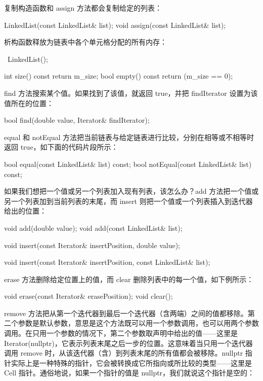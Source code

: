 复制构造函数和 assign 方法都会复制给定的列表：

\begin{codebox}
    LinkedList(const LinkedList& list);
    void assign(const LinkedList& list);
\end{codebox}

析构函数释放为链表中各个单元格分配的所有内存：

\begin{codebox}
    ~LinkedList();

    int size() const {return m_size;}
    bool empty() const {return (m_size == 0);}
\end{codebox}

find 方法搜索某个值。如果找到了该值，就返回 true，并把 findIterator 设置为该值所在的位置：

\begin{codebox}
    bool find(double value, Iterator& findIterator);
\end{codebox}

equal 和 notEqual 方法把当前链表与给定链表进行比较，分别在相等或不相等时返回 true，如下面的代码片段所示：

\begin{codebox}
    bool equal(const LinkedList& list) const;
    bool notEqual(const LinkedList& list) const;
\end{codebox}

如果我们想把一个值或另一个列表加入现有列表，该怎么办？add 方法把一个值或另一个列表加到当前列表的末尾，而 insert 则把一个值或一个列表插入到迭代器给出的位置：

\begin{codebox}
    void add(double value);
    void add(const LinkedList& list);

    void insert(const Iterator& insertPosition, double value);

    void insert(const Iterator& insertPosition,
                const LinkedList& list);
\end{codebox}

erase 方法删除给定位置上的值，而 clear 删除列表中的每一个值，如下例所示：

\begin{codebox}
    void erase(const Iterator& erasePosition);
    void clear();
\end{codebox}

remove 方法把从第一个迭代器到最后一个迭代器（含两端）之间的值都移除。第二个参数是默认参数，意思是这个方法既可以用一个参数调用，也可以用两个参数调用。在只用一个参数的情况下，第二个参数取声明中给出的值——这里是 Iterator(nullptr)，它表示列表末尾之后一步的位置。这意味着当只用一个迭代器调用 remove 时，从该迭代器（含）到列表末尾的所有值都会被移除。nullptr 指针实际上是一种特殊的指针，它会被转换成它所指向或所比较的类型——这里是 Cell 指针。通俗地说，如果一个指针的值是 nullptr，我们就说这个指针是空的：

